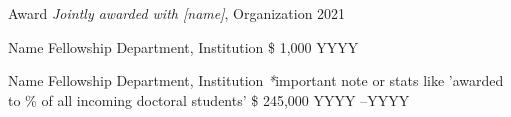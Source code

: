 
\begin{cvhonors}

    \cvhonor
    { Award} %
    { \textit{Jointly awarded with [name]}, Organization } %
    {} %
    {2021} %
\end{cvhonors}


\begin{cvhonors}
  \cvhonor
    {Name Fellowship} %
    {Department, Institution} %
    {\$ 1,000} %
    {YYYY} %

  \cvhonor
    {Name Fellowship} %
    {Department, Institution \scriptsize{\textit{*}important note or stats like 'awarded to  \% of all incoming doctoral students'}} %
    {\$ 245,000} %
    {YYYY --YYYY} %
    
\end{cvhonors}
\newpage
